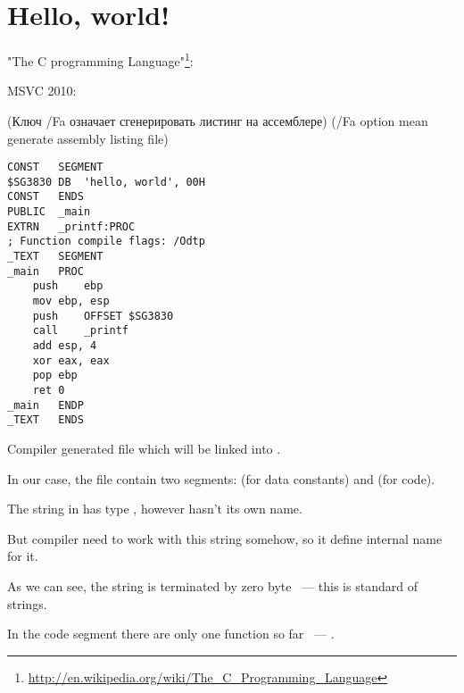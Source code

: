 ﻿%

\section{Hello, world!}
\label{sec:helloworld}

 "The C programming Language"\footnote{\url{http://en.wikipedia.org/wiki/The_C_Programming_Language}}:



 MSVC 2010: 

\IFRU
{(Ключ /Fa означает сгенерировать листинг на ассемблере)}
{(/Fa option mean generate assembly listing file)}

\begin{lstlisting}
CONST	SEGMENT
$SG3830	DB	'hello, world', 00H
CONST	ENDS
PUBLIC	_main
EXTRN	_printf:PROC
; Function compile flags: /Odtp
_TEXT	SEGMENT
_main	PROC
	push	ebp
	mov	ebp, esp
	push	OFFSET $SG3830
	call	_printf
	add	esp, 4
	xor	eax, eax
	pop	ebp
	ret	0
_main	ENDP
_TEXT	ENDS
\end{lstlisting}

{Compiler generated  file which will be linked into .}

{In our case, the file contain two segments:  (for data constants) and  (for code).} 

{The string  in \CCpp has type , however hasn't its own name.}

{But compiler need to work with this string somehow, so it define internal name  for it.}

{As we can see, the string is terminated by zero byte ~--- this is \CCpp standard of strings.}

{In the code segment  there are only one function so far ~--- .}

